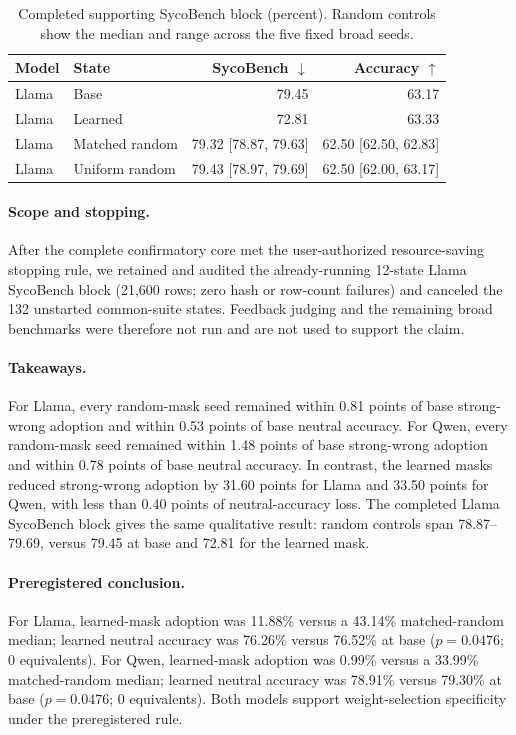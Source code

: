 \begin{table}[t]
\centering
\caption{Completed supporting SycoBench block (percent). Random controls show
the median and range across the five fixed broad seeds.}
\label{tab:random-mask-sycobench-partial}
\begin{tabular}{llrr}
\toprule
Model & State & SycoBench $\downarrow$ & Accuracy $\uparrow$ \\
\midrule
Llama & Base & 79.45 & 63.17 \\
Llama & Learned & 72.81 & 63.33 \\
Llama & Matched random & 79.32 [78.87, 79.63] & 62.50 [62.50, 62.83] \\
Llama & Uniform random & 79.43 [78.97, 79.69] & 62.50 [62.00, 63.17] \\
\bottomrule
\end{tabular}
\end{table}

\paragraph{Scope and stopping.} After the complete confirmatory core met the user-authorized resource-saving stopping rule, we retained and audited the already-running 12-state Llama SycoBench block (21,600 rows; zero hash or row-count failures) and canceled the 132 unstarted common-suite states. Feedback judging and the remaining broad benchmarks were therefore not run and are not used to support the claim.

\paragraph{Takeaways.} For Llama, every random-mask seed remained within 0.81 points of base strong-wrong adoption and within 0.53 points of base neutral accuracy. For Qwen, every random-mask seed remained within 1.48 points of base strong-wrong adoption and within 0.78 points of base neutral accuracy. In contrast, the learned masks reduced strong-wrong adoption by 31.60 points for Llama and 33.50 points for Qwen, with less than 0.40 points of neutral-accuracy loss. The completed Llama SycoBench block gives the same qualitative result: random controls span 78.87--79.69, versus 79.45 at base and 72.81 for the learned mask.

\paragraph{Preregistered conclusion.} For Llama, learned-mask adoption was 11.88\% versus a 43.14\% matched-random median; learned neutral accuracy was 76.26\% versus 76.52\% at base ($p=0.0476$; 0 equivalents). For Qwen, learned-mask adoption was 0.99\% versus a 33.99\% matched-random median; learned neutral accuracy was 78.91\% versus 79.30\% at base ($p=0.0476$; 0 equivalents). Both models support weight-selection specificity under the preregistered rule.
